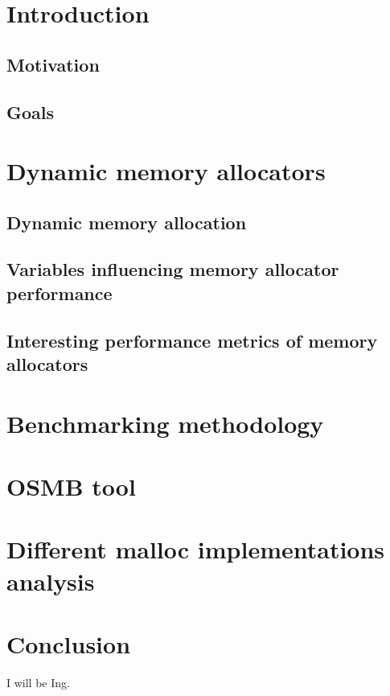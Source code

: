 
\chapter{Introduction}
\section{Motivation}
\section{Goals}
\chapter{Dynamic memory allocators}
\section{Dynamic memory allocation}
\section{Variables influencing memory allocator performance}
\section{Interesting performance metrics of memory allocators}
\chapter{Benchmarking methodology}
\chapter{OSMB tool}
\chapter{Different malloc implementations analysis}
\chapter{Conclusion}
I will be Ing. \cite{Pravidla}

